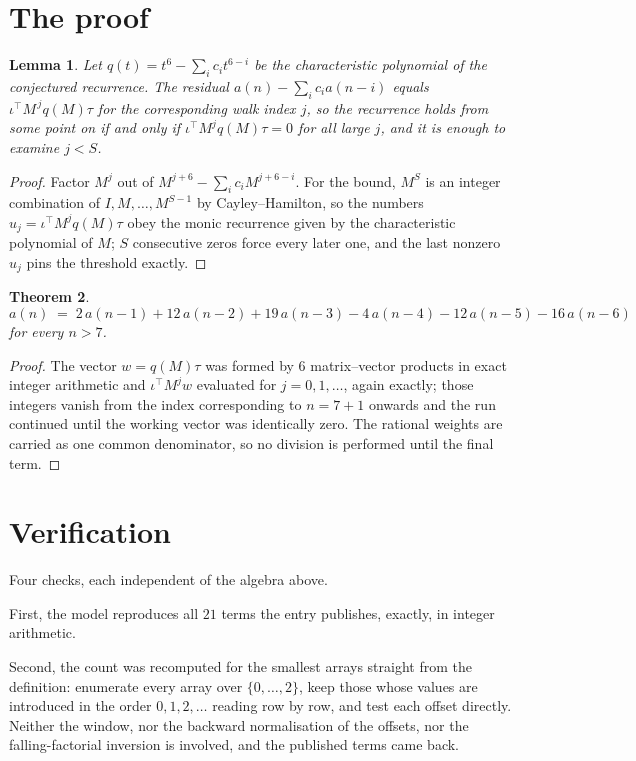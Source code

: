 \documentclass[11pt,a4paper]{article}
\theoremstyle{plain}
\newtheorem{theorem}{Theorem}
\newtheorem{lemma}[theorem]{Lemma}
\theoremstyle{definition}
\begin{document}
\section{The proof}

\begin{lemma}\label{lem:crit}
Let $q(t)=t^{6}-\sum_i c_it^{6-i}$ be the characteristic polynomial of the
conjectured recurrence. The residual $a(n)-\sum_ic_ia(n-i)$ equals
$\iota^{\!\top}M^{\,j}q(M)\tau$ for the corresponding walk index $j$, so the recurrence
holds from some point on if and only if $\iota^{\!\top}M^{j}q(M)\tau=0$ for all large $j$,
and it is enough to examine $j<S$.
\end{lemma}

\begin{proof}
Factor $M^{j}$ out of $M^{j+6}-\sum_ic_iM^{j+6-i}$. For the bound, $M^{S}$
is an integer combination of $I,M,\dots,M^{S-1}$ by Cayley--Hamilton, so the numbers
$u_j=\iota^{\!\top}M^{j}q(M)\tau$ obey the monic recurrence given by the characteristic
polynomial of $M$; $S$ consecutive zeros force every later one, and the last nonzero $u_j$
pins the threshold exactly.
\end{proof}

\begin{theorem}
\[
a(n)\;=\;2\,a(n-1) + 12\,a(n-2) + 19\,a(n-3) - 4\,a(n-4) - 12\,a(n-5) - 16\,a(n-6)
\]
for every $n>7$.
\end{theorem}

\begin{proof}
The vector $w=q(M)\tau$ was formed by $6$ matrix--vector products in exact integer
arithmetic and $\iota^{\!\top}M^{j}w$ evaluated for $j=0,1,\dots$, again exactly; those
integers vanish from the index corresponding to $n=7+1$ onwards and the run continued
until the working vector was identically zero. The rational weights are carried as one common
denominator, so no division is performed until the final term.
\end{proof}

\section{Verification}

Four checks, each independent of the algebra above.

First, the model reproduces all $21$ terms the entry publishes, exactly, in integer
arithmetic.

Second, the count was recomputed for the smallest arrays straight from the definition:
enumerate every array over $\{0,\dots,2\}$, keep those whose values are introduced in the
order $0,1,2,\dots$ reading row by row, and test each offset directly. Neither the window, nor
the backward normalisation of the offsets, nor the falling-factorial inversion is involved, and
the published terms came back.
\end{document}
